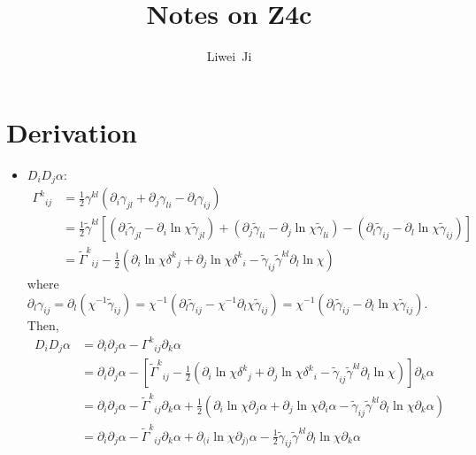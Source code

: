 \documentclass[prd,aps,a4paper,superscriptaddress,onecolumn,footinbib]{revtex4}
\begin{document}
\title{Notes on Z4c}

\author{Liwei~Ji}

\maketitle

\tableofcontents



\section{Derivation}

\begin{itemize}
\item $D_iD_j\alpha$:
  \begin{align}
    \Gamma^{k}{}_{ij}
    &=\frac{1}{2}\gamma^{kl}(\partial_i\gamma_{jl}+\partial_j\gamma_{li}-\partial_l\gamma_{ij})
    \\
    &=\frac{1}{2}\tilde\gamma^{kl}
    \left[
      (\partial_i\tilde\gamma_{jl}-\partial_i\ln\chi\tilde\gamma_{jl})+
      (\partial_j\tilde\gamma_{li}-\partial_j\ln\chi\tilde\gamma_{li})-
      (\partial_l\tilde\gamma_{ij}-\partial_l\ln\chi\tilde\gamma_{ij})
    \right]
    \\
    &=\tilde\Gamma^k{}_{ij}
    -\frac{1}{2}
    (\partial_i\ln\chi\delta^k{}_j+\partial_j\ln\chi\delta^k{}_i
    -\tilde\gamma_{ij}\tilde\gamma^{kl}\partial_l\ln\chi)
  \end{align}
  where
  $\partial_l\gamma_{ij}=\partial_l(\chi^{-1}\tilde\gamma_{ij})
  =\chi^{-1}(\partial_l\tilde{\gamma}_{ij}-\chi^{-1}\partial_l\chi\tilde\gamma_{ij})
  =\chi^{-1}(\partial_l\tilde{\gamma}_{ij}-\partial_l\ln\chi\tilde\gamma_{ij})$.
  Then,
  \begin{align}
    D_iD_j\alpha
    &=\partial_i\partial_j\alpha-\Gamma^k{}_{ij}\partial_k\alpha \\
    &=\partial_i\partial_j\alpha-
    \left[
      \tilde\Gamma^k{}_{ij}
      -\frac{1}{2}
      (\partial_i\ln\chi\delta^k{}_j+\partial_j\ln\chi\delta^k{}_i
      -\tilde\gamma_{ij}\tilde\gamma^{kl}\partial_l\ln\chi)
    \right]\partial_k\alpha \\
    &=\partial_i\partial_j\alpha-
    \tilde\Gamma^k{}_{ij}\partial_k\alpha
    +\frac{1}{2}
    (\partial_i\ln\chi\partial_j\alpha
    +\partial_j\ln\chi\partial_i\alpha
    -\tilde\gamma_{ij}\tilde\gamma^{kl}\partial_l\ln\chi\partial_k\alpha) \\
    &=\partial_i\partial_j\alpha-
    \tilde\Gamma^k{}_{ij}\partial_k\alpha
    +\partial_{(i}\ln\chi\partial_{j)}\alpha
    -\frac{1}{2}\tilde\gamma_{ij}\tilde\gamma^{kl}\partial_l\ln\chi\partial_k\alpha
  \end{align}
\end{itemize}
\end{document}
